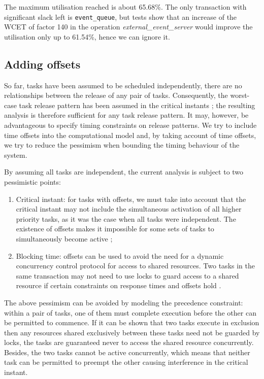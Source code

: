 \documentclass{article}
\begin{document}
The maximum utilisation reached is about 65.68\%. The only transaction with significant slack left is \texttt{event\_queue}, but tests show that an increase of the WCET of factor 140 in the operation \textit{external\_event\_server} would improve the utilisation only up to 61.54\%, hence we can ignore it.

\subsection{Adding offsets}

So far, tasks have been assumed to be scheduled independently, there are no relationships between the release of any pair of tasks. Consequently, the worst-case task release pattern has been assumed in the critical instants \cite{critical-instants}; the resulting analysis is therefore sufficient for any task release pattern. It may, however, be advantageous to specify timing constraints on release patterns. We try to include time offsets into the computational model and, by taking account of time offsets, we try to reduce the pessimism when bounding the timing behaviour of the system.

By assuming all tasks are independent, the current analysis is subject to two pessimistic points:

\begin{enumerate}
   \item Critical instant: for tasks with offsets, we must take into account that the critical instant may not include the simultaneous activation of all higher priority tasks, as it was the case when all tasks were independent. The existence of offsets makes it impossible for some sets of tasks to simultaneously become active \cite{pessimistic-rma};
   \item Blocking time: offsets can be used to avoid the need for a dynamic concurrency control protocol for access to shared resources. Two tasks in the same transaction may not need to use locks to guard access to a shared resource if certain constraints on response times and offsets hold \cite{tindell-offsets}.
\end{enumerate}

The above pessimism can be avoided by modeling the precedence constraint: within a pair of tasks, one of them must complete execution before the other can be permitted to commence. If it can be shown that two tasks execute in exclusion then any resources shared exclusively between these tasks need not be guarded by locks, the tasks are guaranteed never to access the shared resource concurrently. Besides, the two tasks cannot be active concurrently, which means that neither task can be permitted to preempt the other causing interference in the critical instant.
\end{document}
